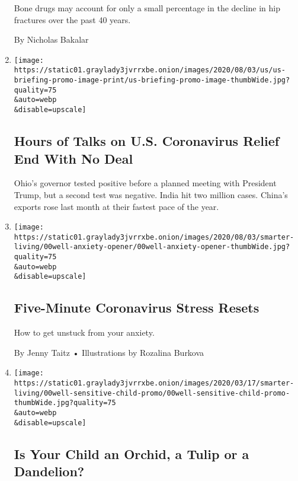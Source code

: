 \begin{enumerate}
  Bone drugs may account for only a small percentage in the decline in
  hip fractures over the past 40 years.

  By Nicholas Bakalar
\item
  \href{/2020/08/06/world/coronavirus-covid.html}{}

  \texttt{[image: https://static01.graylady3jvrrxbe.onion/images/2020/08/03/us/us-briefing-promo-image-print/us-briefing-promo-image-thumbWide.jpg?quality=75\\\&auto=webp\\\&disable=upscale]}

  \hypertarget{hours-of-talks-on-us-coronavirus-relief-end-with-no-deal}{%
  \subsection{Hours of Talks on U.S. Coronavirus Relief End With No
  Deal}\label{hours-of-talks-on-us-coronavirus-relief-end-with-no-deal}}

  Ohio's governor tested positive before a planned meeting with
  President Trump, but a second test was negative. India hit two million
  cases. China's exports rose last month at their fastest pace of the
  year.
\item
  \href{/2020/08/06/well/mind/five-minute-coronavirus-stress-resets.html}{}

  \texttt{[image: https://static01.graylady3jvrrxbe.onion/images/2020/08/03/smarter-living/00well-anxiety-opener/00well-anxiety-opener-thumbWide.jpg?quality=75\\\&auto=webp\\\&disable=upscale]}

  \hypertarget{five-minute-coronavirus-stress-resets-1}{%
  \subsection{Five-Minute Coronavirus Stress
  Resets}\label{five-minute-coronavirus-stress-resets-1}}

  How to get unstuck from your anxiety.

  By Jenny Taitz • Illustrations by Rozalina Burkova
\item
  \href{/2020/08/06/well/family/sensitive-child.html}{}

  \texttt{[image: https://static01.graylady3jvrrxbe.onion/images/2020/03/17/smarter-living/00well-sensitive-child-promo/00well-sensitive-child-promo-thumbWide.jpg?quality=75\\\&auto=webp\\\&disable=upscale]}

  \hypertarget{is-your-child-an-orchid-a-tulip-or-a-dandelion}{%
  \subsection{Is Your Child an Orchid, a Tulip or a
  Dandelion?}\label{is-your-child-an-orchid-a-tulip-or-a-dandelion}}


\end{enumerate}

